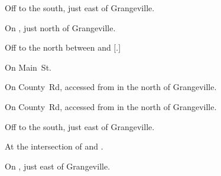 
\begin{LocationList}

Off  to the south, just east of Grangeville.

On , just north of Grangeville.

Off  to the north between  and [.]

On  Main~St.

On County~Rd, accessed from  in the north of Grangeville.

On County~Rd, accessed from  in the north of Grangeville.

Off  to the south, just east of Grangeville.

\Location{\TruckStop \Gas \Rest}
At the intersection of  and .

On , just east of Grangeville.

\end{LocationList}
